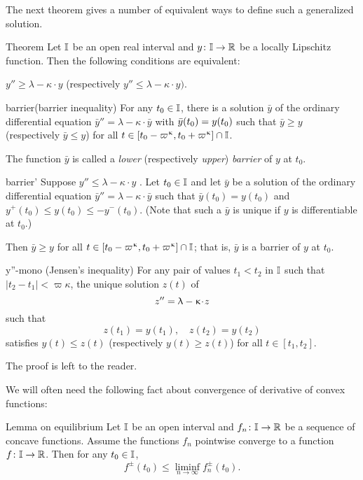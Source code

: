 The next theorem gives a  number of equivalent ways to define such a generalized solution.

\begin{thm}{Theorem}\label{y''=<1-ky}
Let $\mathbb{I}$ be an open real interval and $y\:\II\to\RR$ be a locally Lipschitz function.
Then the following conditions are equivalent:
\begin{subthm}{}$y''\ge \lambda-\kappa\cdot  y$ (respectively $y''\le \lambda-\kappa\cdot  y).$
\end{subthm}

\begin{subthm}{barrier}(barrier inequality) For any $t_0\in \II$, 
there is a solution $\bar y$ 
of the ordinary differential equation $\bar y''=\lambda-\kappa\cdot  \bar y$ 
with $\bar y(t_0)\z= y(t_0)$ such that $\bar y\ge y$ (respectively $\bar y\le y$) for all $t\in [t_0-\varpi\kappa,t_0+\varpi\kappa]\cap \II$.

The function $\bar y$ is called a {}\emph{lower} (respectively {}\emph{upper}) \emph{barrier} of $y$ at $t_0$.
\end{subthm}

\begin{subthm}{barrier'} 
Suppose $y''\le \lambda-\kappa\cdot  y$ . Let $t_0\in\II$ and let  $\bar y$ be a solution of  the
 ordinary differential equation $\bar y''=\lambda-\kappa\cdot  \bar y$ 
such that  $\bar y(t_0)= y(t_0)$ and $y^+(t_0)\le y(t_0)\le -y^-(t_0)$. (Note that such a $\bar{y}$ is unique if $y$ is differentiable at $t_0$.) 

Then $\bar y\ge y$  for all $t\in [t_0-\varpi\kappa,t_0+\varpi\kappa]\cap \II$; that is, $\bar{y}$ is a barrier of $y$ at $t_0$.
\end{subthm}

\begin{subthm}{y''-mono} (Jensen's inequality)
For any pair of values $t_1<t_2$ in $\mathbb{I}$ such that $|t_2-t_1|<\varpi\kappa$,  the unique solution $z(t)$ of \[z''\z=\lambda-\kappa\cdot  z\] such that
\[z(t_1)=y(t_1),\quad z(t_2)=y(t_2)\] 
satisfies $y(t)\le z(t)$ (respectively $y(t)\ge z(t)$) for all $t\in[t_1,t_2]$.
\end{subthm}
\end{thm}

The proof is left to the reader.

We will often need the following fact about convergence of derivative of convex functions:

{\sloppy 

\begin{thm}{Lemma on equilibrium}\label{lem:der-conv-lim}
Let $\mathbb{I}$ be an open interval 
and $f_n\:\II\to\RR$ be a sequence of concave functions. 
Assume the functions $f_n$ pointwise converge to a function $f\:\II\to\RR$.
Then for any $t_0\in \II$,
\[f^\pm(t_0)\le \liminf_{n\to\infty}f^\pm_n(t_0).\]
\end{thm}

}

